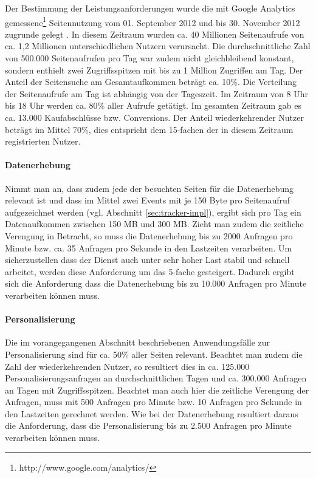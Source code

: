 Der Bestimmung der Leistungsanforderungen wurde die mit Google Analytics gemessene\footnote{http://www.google.com/analytics/} Seitennutzung vom 01. September 2012 und bis 30. November 2012 zugrunde gelegt . In diesem Zeitraum wurden ca. 40 Millionen Seitenaufrufe von ca. 1,2 Millionen unterschiedlichen Nutzern verursacht. Die durchschnittliche Zahl von 500.000 Seitenaufrufen pro Tag war zudem nicht gleichbleibend konstant, sondern enthielt zwei Zugriffsspitzen mit bis zu 1 Million Zugriffen am Tag. Der Anteil der Seitensuche am Gesamtaufkommen beträgt ca. 10\%. Die Verteilung der Seitenaufrufe am Tag ist abhängig von der Tageszeit. Im Zeitraum von 8 Uhr bis 18 Uhr werden ca. 80\% aller Aufrufe getätigt. Im gesamten Zeitraum gab es ca. 13.000 Kaufabschlüsse bzw. Conversions. Der Anteil wiederkehrender Nutzer beträgt im Mittel 70\%, dies entspricht dem 15-fachen der in diesem Zeitraum registrierten Nutzer.

\paragraph{Datenerhebung} Nimmt man an, dass zudem jede der besuchten Seiten für die Datenerhebung relevant ist und dass im Mittel zwei Events mit je 150 Byte pro Seitenaufruf aufgezeichnet werden (vgl. Abschnitt \ref{sec:tracker-impl}), ergibt sich pro Tag ein Datenaufkommen zwischen 150 MB und 300 MB. Zieht man zudem die zeitliche Verengung in Betracht, so muss die Datenerhebung bis zu 2000 Anfragen pro Minute bzw. ca. 35 Anfragen pro Sekunde in den Lastzeiten verarbeiten. Um sicherzustellen dass der Dienst auch unter sehr hoher Last stabil und schnell arbeitet, werden diese Anforderung um das 5-fache gesteigert. Dadurch ergibt sich die Anforderung dass die Datenerhebung bis zu 10.000 Anfragen pro Minute verarbeiten können muss.

\paragraph{Personalisierung} Die im vorangegangenen Abschnitt beschriebenen Anwendungsfälle zur Personalisierung sind für ca. 50\% aller Seiten relevant. Beachtet man zudem die Zahl der wiederkehrenden Nutzer, so resultiert dies in ca. 125.000 Personalisierungsanfragen an durchschnittlichen Tagen und ca. 300.000 Anfragen an Tagen mit Zugriffsspitzen. Beachtet man auch hier die zeitliche Verengung der Anfragen, muss mit 500 Anfragen pro Minute bzw. 10 Anfragen pro Sekunde in den Lastzeiten gerechnet werden. Wie bei der Datenerhebung resultiert daraus die Anforderung, dass die Personalisierung bis zu 2.500 Anfragen pro Minute verarbeiten können muss. 



